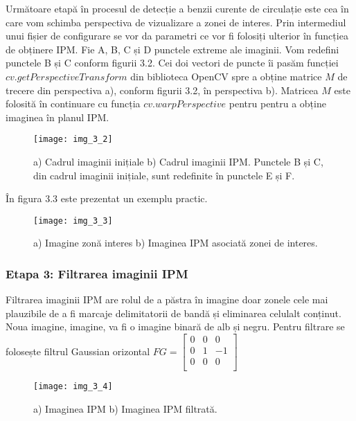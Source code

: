 Următoare etapă în procesul de detecție a benzii curente de circulație este cea în care vom schimba perspectiva de vizualizare a zonei de interes. Prin intermediul unui fișier de configurare se vor da parametri ce vor fi folosiți ulterior în funcțiea de obținere IPM. Fie A, B, C și D punctele extreme ale imaginii. Vom redefini punctele B și C conform figurii 3.2. Cei doi vectori de puncte îi pasăm funcției $cv.getPerspectiveTransform$ din biblioteca OpenCV spre a obține matrice $M$ de trecere din perspectiva a), conform figurii 3.2, în perspectiva b). Matricea $M$ este folosită în continuare cu funcția $cv.warpPerspective$ pentru pentru a obține imaginea în planul IPM.
\begin{figure}[!h]
	\centering
	\texttt{[image: img\_3\_2]}
	\caption[Transformare IPM]{a) Cadrul imaginii inițiale b) Cadrul imaginii IPM. Punctele B și C, din cadrul imaginii inițiale, sunt redefinite în punctele E și F.}
\end{figure}

În figura 3.3 este prezentat un exemplu practic.
\begin{figure}[!h]
	\centering
	\texttt{[image: img\_3\_3]}
	\caption[Transformare IPM în practică]{a) Imagine zonă interes b) Imaginea IPM asociată zonei de interes.}
\end{figure}


\subsubsection{Etapa 3: Filtrarea imaginii IPM}

Filtrarea imaginii IPM are rolul de a păstra în imagine doar zonele cele mai plauzibile de a fi marcaje delimitatorii de bandă și eliminarea celulalt conținut. Noua imagine, imagine, va fi o imagine binară de alb și negru. Pentru filtrare se folosește filtrul Gaussian orizontal
$ FG = 
\begin{bmatrix}
	0 & 0 & 0 \\
	0 & 1 & -1 \\
	0 & 0 & 0 \\
\end{bmatrix}
$
\begin{figure}[!h]
	\centering
	\texttt{[image: img\_3\_4]}
	\caption[Imagine IPM filtrată]{a) Imaginea IPM b) Imaginea IPM filtrată.}
\end{figure}

